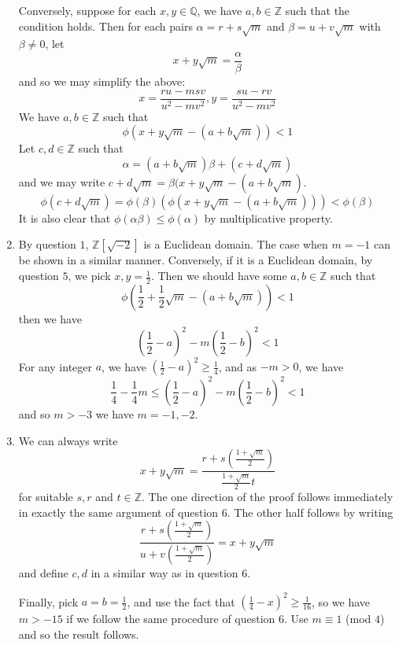\begin{enumerate}
      Conversely, suppose for each $x,y \in \mathbb{Q}$, we have $a,b \in \mathbb{Z}$ such that the condition holds. Then for each pairs $\alpha=r+s\sqrt{m}$ and $\beta=u+v\sqrt{m}$ with $\beta \neq0$, let
      $$x+y\sqrt{m}=\frac{\alpha}{\beta}$$
      and so we may simplify the above:
      $$x=\frac{ru-msv}{u^2-mv^2},y=\frac{su-rv}{u^2-mv^2}$$
      We have $a,b \in \mathbb{Z}$ such that
      $$\phi(x+y\sqrt{m}-(a+b\sqrt{m}))<1$$
      Let $c,d \in \mathbb{Z}$ such that
      $$\alpha=(a+b\sqrt{m})\beta+(c+d\sqrt{m})$$
      and we may write $c+d\sqrt{m}=\beta(x+y\sqrt{m}-(a+b\sqrt{m})$.
      $$\phi(c+d\sqrt{m})=\phi(\beta)\left(\phi\left(x+y\sqrt{m}-(a+b\sqrt{m})\right)\right)<\phi(\beta)$$
      It is also clear that $\phi(\alpha \beta) \le \phi(\alpha)$ by multiplicative property.\\
\item By question $1$, $\mathbb{Z}[\sqrt{-2}]$ is a Euclidean domain. The case when $m=-1$ can be shown in a similar manner. Conversely, if it is a Euclidean domain, by question $5$, we pick $x,y=\frac{1}{2}$. Then we should have some $a,b \in \mathbb{Z}$ such that
    $$\phi\left(\frac{1}{2}+\frac{1}{2}\sqrt{m}-(a+b\sqrt{m})\right)<1$$
    then we have
    $$\left(\frac{1}{2}-a\right)^2-m\left(\frac{1}{2}-b\right)^2 <1$$
    For any integer $a$, we have $(\frac{1}{2}-a)^2 \ge \frac{1}{4}$, and as $-m>0$, we have
    $$\frac{1}{4}-\frac{1}{4}m \le \left(\frac{1}{2}-a\right)^2-m\left(\frac{1}{2}-b\right)^2 <1$$
    and so $m>-3$ we have $m=-1,-2$.\\
\item We can always write
    $$x+y\sqrt{m}=\frac{r+s\left(\frac{1+\sqrt{m}}{2}\right)}{\frac{1+\sqrt{m}}{2}t}$$
    for suitable $s,r$ and $t \in \mathbb{Z}$. The one direction of the proof follows immediately in exactly the same argument of question 6. The other half follows by writing
    $$\frac{r+s\left(\frac{1+\sqrt{m}}{2}\right)}{u+v\left(\frac{1+\sqrt{m}}{2}\right)}=x+y\sqrt{m}$$
    and define $c,d$ in a similar way as in question 6.

    Finally, pick $a=b=\frac{1}{2}$, and use the fact that $(\frac{1}{4}-x)^2 \ge \frac{1}{16}$, so we have $m >-15$ if we follow the same procedure of question 6. Use $m \equiv 1$ (mod $4$) and so the result follows.
\end{enumerate}
